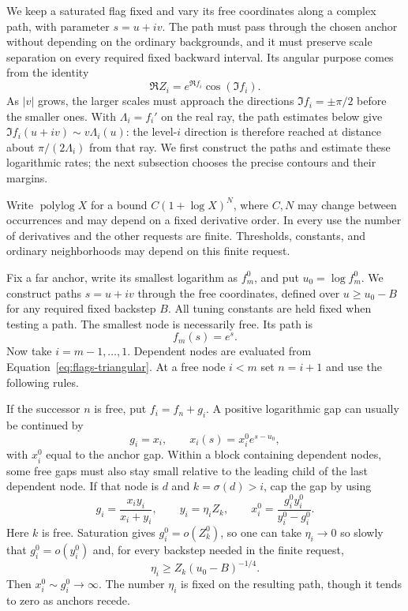 We keep a saturated flag fixed and vary its free coordinates along a
complex path, with parameter $s=u+iv$. The path must pass through the
chosen anchor without
depending on the ordinary backgrounds, and it must preserve scale
separation on every required fixed backward interval. Its angular purpose
comes from the identity
\[
 \Re Z_i=e^{\Re f_i}\cos(\Im f_i).
\]
As $|v|$ grows, the larger scales must approach the directions
$\Im f_i=\pm\pi/2$ before the smaller ones. With
$\Lambda_i=f_i'$ on the real ray, the path estimates below give
$\Im f_i(u+iv)\sim v\Lambda_i(u)$: the level-$i$ direction is
therefore reached at distance about $\pi/(2\Lambda_i)$ from that
ray. We first construct the paths and estimate these logarithmic rates;
the next subsection chooses the precise contours and their margins.


Write $\operatorname{polylog}X$ for a bound
$C(1+\log X)^N$, where $C,N$ may change between occurrences and may
depend on a fixed derivative order. In every use the number of
derivatives and the other requests are finite. Thresholds, constants,
and ordinary neighborhoods may depend on this finite request.

Fix a far anchor, write its smallest logarithm as $f_m^0$, and put
$u_0=\log f_m^0$. We construct paths $s=u+iv$ through the free
coordinates, defined over $u\ge u_0-B$ for any required fixed
backstep $B$. All tuning constants are held fixed when testing a path.
The smallest node is necessarily free. Its path is
\[
 f_m(s)=e^s.
\]
Now take $i=m-1,\ldots,1$. Dependent nodes are evaluated from
Equation~\eqref{eq:flags-triangular}. At a free node $i<m$ set
$n=i+1$ and use the following rules.

If the successor $n$ is free, put $f_i=f_n+g_i$. A positive
logarithmic gap can usually be continued by
\begin{equation}\label{eq:flags-uncapped}
 g_i=x_i,\qquad x_i(s)=x_i^0 e^{s-u_0},
\end{equation}
with $x_i^0$ equal to the anchor gap. Within a block containing
dependent nodes, some free gaps must also stay small relative to the
leading child of the last dependent node. If that node is $d$ and
$k=\sigma(d)>i$, cap the gap by using
\begin{equation}\label{eq:flags-cap}
 g_i=\frac{x_i y_i}{x_i+y_i},\qquad
 y_i=\eta_i Z_k,
 \qquad
 x_i^0=\frac{g_i^0y_i^0}{y_i^0-g_i^0}.
\end{equation}
Here $k$ is free. Saturation gives $g_i^0=o(Z_k^0)$, so one can take
$\eta_i\to0$ so slowly that $g_i^0=o(y_i^0)$ and, for every
backstep needed in the finite request,
\begin{equation}\label{eq:flags-eta}
 \eta_i\ge Z_k(u_0-B)^{-1/4}.
\end{equation}
Then $x_i^0\sim g_i^0\to\infty$. The number $\eta_i$ is fixed
on the resulting path, though it tends to zero as anchors recede.

